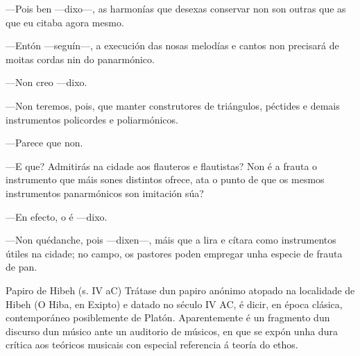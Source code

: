 —Pois ben —dixo—, as harmonías que desexas conservar non son outras que as que eu citaba agora mesmo.

—Entón —seguín—, a execución das nosas melodías e cantos non precisará de moitas cordas nin do panarmónico.

—Non creo —dixo.

—Non teremos, pois, que manter construtores de triángulos, péctides e demais instrumentos policordes e poliarmónicos.

—Parece que non.

—E que? Admitirás na cidade aos flauteros e flautistas? Non é a frauta o instrumento que máis sones distintos ofrece, ata o punto de que os mesmos instrumentos panarmónicos son imitación súa?

—En efecto, o é —dixo.

—Non quédanche, pois —dixen—, máis que a lira e cítara como instrumentos útiles na cidade; no campo, os pastores poden empregar unha especie de frauta de pan.

Papiro de Hibeh (s. IV aC)
Trátase dun papiro anónimo atopado na localidade de Hibeh (O Hiba, en Exipto) e datado no século IV AC, é dicir, en época clásica, contemporáneo posiblemente de Platón. Aparentemente é un fragmento dun discurso dun músico ante un auditorio de músicos, en que se expón unha dura crítica aos teóricos musicais con especial referencia á teoría do ethos.

